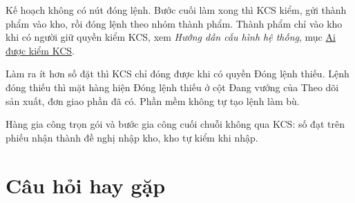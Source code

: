 \documentclass[11pt,a4paper]{article}
\newcommand{\q}[1]{\textquotedbl#1\textquotedbl{}}
\newcommand{\tl}[1]{\textit{#1}}
\newcommand{\cauhinh}{../huong-dan-cau-hinh/cau-hinh-he-thong.pdf}
\newcommand{\kbn}[2]{\href{\cauhinh\##1}{\textcolor{lienket}{#2}}}
\newcommand{\kb}[2]{\tl{Hướng dẫn cấu hình hệ thống}, mục \kbn{#1}{#2}}
\begin{document}
Kế hoạch không có nút đóng lệnh. Bước cuối làm xong thì KCS kiểm, gửi thành phẩm vào kho, rồi đóng lệnh theo nhóm
thành phẩm. Thành phẩm chỉ vào kho khi có người giữ quyền kiểm KCS, xem \kb{danh-muc-kcs-quyen}{Ai được kiểm KCS}.

Làm ra ít hơn số đặt thì KCS chỉ đóng được khi có quyền \q{Đóng lệnh thiếu}. Lệnh đóng thiếu thì mặt hàng hiện
\q{Đóng lệnh thiếu} ở cột Đang vướng của Theo dõi sản xuất, đơn giao phần đã có. Phần mềm không tự tạo lệnh làm bù.

Hàng gia công trọn gói và bước gia công cuối chuỗi không qua KCS: số đạt trên phiếu nhận thành đề nghị nhập kho,
kho tự kiểm khi nhập.

\section{Câu hỏi hay gặp}\label{hoi-dap}
\end{document}
